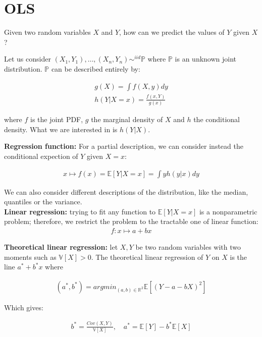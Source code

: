 \section{OLS}

Given two random variables $X$ and $Y$, how can we predict the values of $Y$ given $X$?

Let us consider $(X_1, Y_1), \ldots, (X_n, Y_n) \sim^{iid } \mathbb{P}$ where $\mathbb{P}$ is an unknown joint distribution. $\mathbb{P}$ can be described entirely by:

\begin{align*}
g(X) = \int f(X, y)dy\\
h(Y|X=x) = \frac{f(x, Y)}{g(x)}
\end{align*}

where $f$ is the joint PDF, $g$ the marginal density of $X$ and $h$ the conditional density. What we are interested in is $h(Y|X)$.

\textbf{Regression function:} For a partial description, we can consider instead the conditional expection of $Y$ given $X=x$:

\begin{align*}
x \mapsto f(x) = \mathbb{E}[Y | X=x] = \int yh(y|x)dy
\end{align*}

We can also consider different descriptions of the distribution, like the median, quantiles or the variance.\\
\textbf{Linear regression:} trying to fit any function to $\mathbb{E}[Y | X=x]$ is a nonparametric problem; therefore, we restrict the problem to the tractable one of linear function:
\begin{align*}
f: x \mapsto a + bx
\end{align*}

\textbf{Theoretical linear regression:} let $X, Y$ be two random variables with two moments such as $\mathbb{V}[X] > 0$. The theoretical linear regression of $Y$ on $X$ is the line $a^{*} + b^{*}x$ where

\begin{align*}
(a^{*}, b^{*}) = argmin_{(a, b) \in \mathbb{R}^2}\mathbb{E}\left[(Y - a - bX)^2\right]
\end{align*}

Which gives:

\begin{align*}
b^{*} = \frac{Cov(X, Y)}{\mathbb{V}[X]}, \quad a^{*} = \mathbb{E}[Y] - b^{*} \mathbb{E}[X]
\end{align*}

